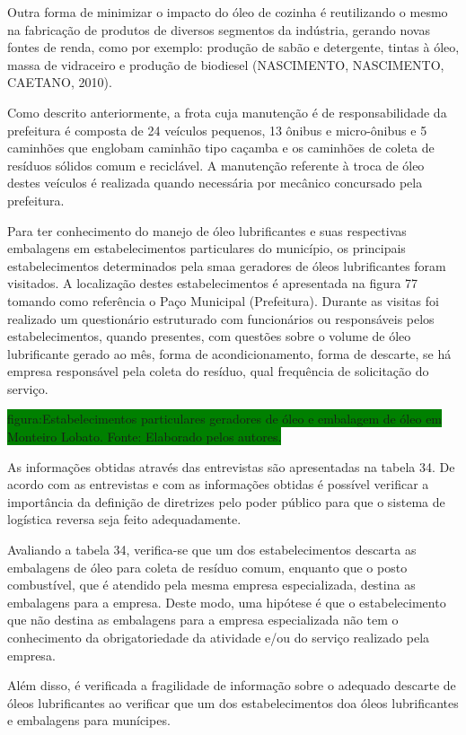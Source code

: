 \begin{description}
	Outra forma de minimizar o impacto do óleo de cozinha é reutilizando o mesmo na fabricação de produtos de diversos segmentos da indústria, gerando novas fontes de renda, como por exemplo: produção de sabão e detergente, tintas à óleo, massa de vidraceiro e produção de biodiesel (NASCIMENTO, NASCIMENTO, CAETANO, 2010).
	
	Como descrito anteriormente, a frota cuja manutenção é de responsabilidade da prefeitura é composta de 24 veículos pequenos, 13 	ônibus e micro-ônibus e 5 caminhões que englobam caminhão tipo caçamba e os caminhões de coleta de resíduos sólidos comum e reciclável. A manutenção referente à troca de óleo destes veículos é realizada quando necessária por mecânico concursado pela prefeitura.
	
	Para ter conhecimento do manejo de óleo lubrificantes e suas respectivas embalagens em estabelecimentos particulares do município, os principais estabelecimentos determinados pela \gls{smaa} geradores de óleos lubrificantes foram visitados. A localização destes estabelecimentos é apresentada na figura 77 tomando como referência o Paço Municipal (Prefeitura). Durante as visitas foi realizado um questionário estruturado com funcionários ou responsáveis pelos estabelecimentos, quando presentes, com questões sobre o volume de óleo lubrificante gerado ao mês, forma de acondicionamento, forma de descarte, se há empresa responsável pela coleta do resíduo, qual frequência de solicitação do serviço.
	
	\colorbox{green}{figura:Estabelecimentos particulares geradores de óleo e embalagem de óleo em Monteiro Lobato. Fonte: Elaborado pelos autores.}
	
	As informações obtidas através das entrevistas são apresentadas na tabela 34. De acordo com as entrevistas e com as informações obtidas é possível verificar a importância da definição de diretrizes pelo poder público para que o sistema de logística reversa seja feito adequadamente.
	
	Avaliando a tabela 34, verifica-se que um dos estabelecimentos descarta as embalagens de óleo para coleta de resíduo comum, enquanto que o posto combustível, que é atendido pela mesma empresa especializada, destina as embalagens para a empresa. Deste modo, uma hipótese é que o estabelecimento que não destina as embalagens para a empresa especializada não tem o conhecimento da obrigatoriedade da atividade e/ou do serviço realizado pela empresa.
	
	Além disso, é verificada a fragilidade de informação sobre o adequado descarte de óleos lubrificantes ao verificar que um dos estabelecimentos doa óleos lubrificantes e embalagens para munícipes.
	

\end{description}
